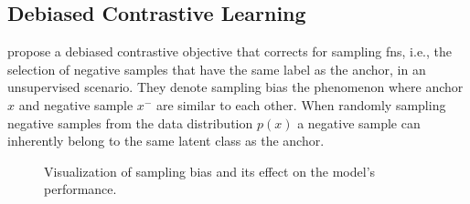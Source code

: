 \subsection{Debiased Contrastive Learning}\label{subsec:debiasing_cl}

\citet{chuang_debiased_2020} propose a debiased contrastive objective that corrects for sampling \acp{fn}, 
i.e., the selection of negative samples that have the same label as the anchor, in an unsupervised scenario.
They denote sampling bias the phenomenon where anchor $x$ and negative sample $x^-$ are similar to each other.
When randomly sampling negative samples from the data distribution $p(x)$ 
a negative sample can inherently belong to the same latent class as the anchor.

\begin{figure}%
    \centering
    \qquad
    \caption{Visualization of sampling bias and its effect on the model's performance.}%
    \label{fig:sampling_bias}%
\end{figure}